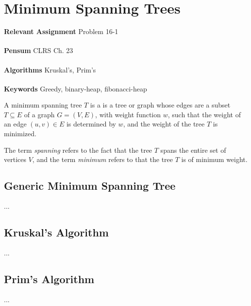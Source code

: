 
\chapter{Minimum Spanning Trees}
\label{ch:minimumspanningtrees}

\textbf{Relevant Assignment} Problem 16-1\\\\
\textbf{Pensum} CLRS Ch. 23\\\\
\textbf{Algorithms} Kruskal's, Prim's\\\\
\textbf{Keywords} Greedy, binary-heap, fibonacci-heap
\vspace{1in}

\noindent A minimum spanning tree $T$ is a is a tree or graph whose edges are
a subset $T \subseteq E$ of a graph $G = (V, E)$, with weight function $w$,
such that the weight of an edge $(u, v) \in E$ is determined by $w$, and the
weight of the tree $T$ is minimized.

The term \textit{spanning} refers to the fact that the tree $T$ spans the
entire set of vertices $V$, and the term \textit{minimum} refers to that the
tree $T$ is of minimum weight.

\newpage
\section{Generic Minimum Spanning Tree}
...



\section{Kruskal's Algorithm}
...


\section{Prim's Algorithm}
...

